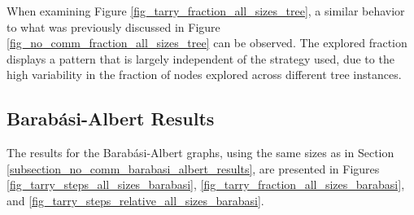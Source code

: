 When examining Figure \ref{fig_tarry_fraction_all_sizes_tree}, a similar behavior to what was previously discussed in Figure \ref{fig_no_comm_fraction_all_sizes_tree} can be observed. The explored fraction displays a pattern that is largely independent of the strategy used, due to the high variability in the fraction of nodes explored across different tree instances.

\subsection{Barabási-Albert Results} 
\label{subsection_tarry_barabasi_albert_results}

The results for the Barabási-Albert graphs, using the same sizes as in Section \ref{subsection_no_comm_barabasi_albert_results}, are presented in Figures \ref{fig_tarry_steps_all_sizes_barabasi}, \ref{fig_tarry_fraction_all_sizes_barabasi}, and \ref{fig_tarry_steps_relative_all_sizes_barabasi}.


